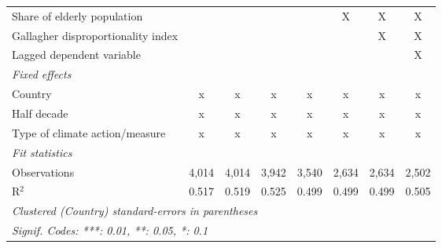 \begin{table}[htbp]
\begin{tabular}{lccccccc}
      Share of elderly population                                      &               &              &               &             & X       & X       & X\\  
      Gallagher disproportionality index                               &               &              &               &             &         & X       & X\\  
      Lagged dependent variable                                        &               &              &               &             &         &         & X\\  
      \emph{Fixed effects}\\
      Country                                                          & x             & x            & x             & x           & x       & x       & x\\  
      Half decade                                                      & x             & x            & x             & x           & x       & x       & x\\  
      Type of climate action/measure                                   & x             & x            & x             & x           & x       & x       & x\\  
      \midrule \emph{Fit statistics}\\
      Observations                                                     & 4,014         & 4,014        & 3,942         & 3,540       & 2,634   & 2,634   & 2,502\\  
      R$^2$                                                            & 0.517         & 0.519        & 0.525         & 0.499       & 0.499   & 0.499   & 0.505\\  
      \midrule
      \multicolumn{8}{l}{\emph{Clustered (Country) standard-errors in parentheses}}\\
      \multicolumn{8}{l}{\emph{Signif. Codes: ***: 0.01, **: 0.05, *: 0.1}}\\
   \end{tabular}
\end{table}


